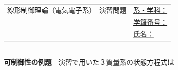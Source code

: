 \documentclass[a4paper,11pt]{jreport}
\begin{document}
\newpage


\begin{tabular}{cl}
\hspace*{2cm}
{\large 線形制御理論（電気電子系）　演習問題}
\hspace{1cm}
&
\underline{系・学科：\hspace{3cm}}
\\[2mm]
&\underline{学籍番号：\hspace{3cm}}
\\[2mm]
&\underline{氏名：\hspace{5cm}}
\end{tabular}
\ \\

\noindent
{\bf 可制御性の例題}　演習で用いた３質量系の状態方程式は
\end{document}
